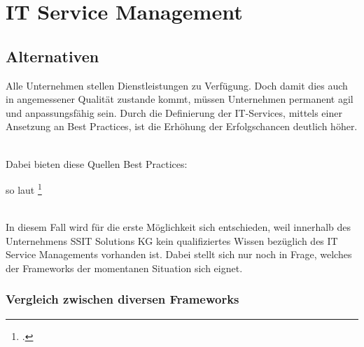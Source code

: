 \chapter{IT Service Management}
\label{chap: IT Service Management}

\section{Alternativen}
\label{chap: Moeglichkeiten zur Servicedefinierung}

Alle Unternehmen stellen Dienstleistungen zu Verfügung. Doch damit dies auch in angemessener Qualität zustande kommt, 
müssen Unternehmen permanent agil und anpassungsfähig sein. Durch die Definierung der IT-Services, mittels einer Ansetzung an Best Practices, 
ist die Erhöhung der Erfolgschancen deutlich höher.
\

Dabei bieten diese Quellen Best Practices:

\begin{quote}
\end{quote}

so laut \footcite[][Kap.\ 1.1]{ITIL}

\noindent
\\
In diesem Fall wird für die erste Möglichkeit sich entschieden,
weil innerhalb des Unternehmens SSIT Solutions KG kein qualifiziertes
 Wissen bezüglich des IT Service Managements vorhanden ist.
 Dabei stellt sich nur noch in Frage, welches der Frameworks der momentanen Situation
 sich eignet.

\subsection{Vergleich zwischen diversen Frameworks}
\label{chap: Vergleich Frameworks}

